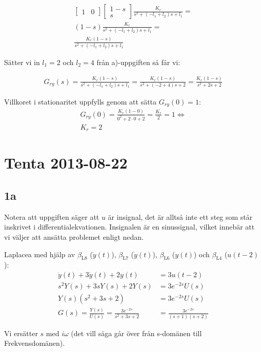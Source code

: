 \documentclass[a4paper]{article}
\newcommand{\mhb}[1]{$\beta_{\text{#1}}$}     %
\begin{document}
\begin{align*}
  \begin{bmatrix}1 & 0\end{bmatrix} \begin{bmatrix}1 - s \\ s\end{bmatrix} \frac{K_r}{s^2 + (-l_1 + l_2)s + l_1} = \\
  (1 - s) \frac{K_r}{s^2 + (-l_1 + l_2)s + l_1} = \\
  \frac{K_r(1 - s)}{s^2 + (-l_1 + l_2)s + l_1}
\end{align*}

Sätter vi in $l_1 = 2$ och $l_2 = 4$ från a)-uppgiften så får vi:

\begin{align*}
  G_{ry}(s) = \frac{K_r(1 - s)}{s^2 + (-l_1 + l_2)s + l_1} = \frac{K_r(1 - s)}{s^2 + (-2 + 4)s + 2} = \frac{K_r(1 - s)}{s^2 + 2s + 2}
\end{align*}

Villkoret i stationaritet uppfylls genom att sätta $G_{ry}(0) = 1$:
\begin{align*}
  G_{ry}(0) = \frac{K_r(1 - 0)}{0^2 + 2\cdot 0 + 2} = \frac{K_r}{2} = 1 \Longleftrightarrow\\
  K_r = 2
\end{align*}


\section{Tenta 2013-08-22}
\subsection{1a}
Notera att uppgiften säger att $u$ är insignal, det är alltså inte ett steg som står inskrivet i differentialekvationen. Insignalen är en sinussignal, vilket innebär att vi väljer att ansätta problemet enligt nedan.

Laplacea med hjälp av \mhb{L8} ($\ddot{y}(t)$), \mhb{L7} ($\dot{y}(t)$), \mhb{L6} ($y(t)$) och \mhb{L4} ($u(t - 2)$):
\begin{align*}
  \ddot y(t) + 3 \dot y(t) + 2y(t) &= 3u(t-2)\\
  s^2Y(s) + 3sY(s) + 2Y(s) &= 3e^{-2s}U(s)\\
  Y(s)(s^2 + 3s + 2) &= 3e^{-2s}U(s)\\
  G(s) = \frac{Y(s)}{U(s)} = \frac{3e^{-2s}}{s^2 + 3s + 2} &= \frac{3e^{-2s}}{(s + 1)(s + 2)}
\end{align*}


Vi ersätter $s$ med $i\omega$ (det vill säga går över från s-domänen till Frekvensdomänen).
\end{document}
